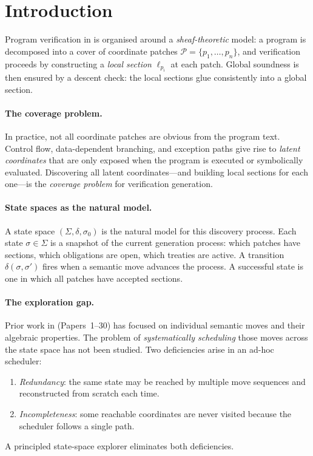 \documentclass[11pt]{article}
\newcommand{\St}{\Sigma}                      %
\newcommand{\state}{\sigma}                   %
\newcommand{\Trans}{\delta}                   %
\newcommand{\LocalSec}{\ell}                  %
\newcommand{\patchset}{\mathcal{P}}           %
\begin{document}
\newpage

\section{Introduction}\label{sec:intro}

Program verification in \JuGeo{} is organised around a
\emph{sheaf-theoretic} model: a program is decomposed into a cover of
coordinate patches $\patchset = \{p_1, \dots, p_n\}$, and verification
proceeds by constructing a \emph{local section} $\LocalSec_{p_i}$ at
each patch.  Global soundness is then ensured by a descent check: the
local sections glue consistently into a global section.

\paragraph{The coverage problem.}
In practice, not all coordinate patches are obvious from the program
text.  Control flow, data-dependent branching, and exception paths
give rise to \emph{latent coordinates} that are only exposed when the
program is executed or symbolically evaluated.  Discovering all latent
coordinates---and building local sections for each one---is the
\emph{coverage problem} for verification generation.

\paragraph{State spaces as the natural model.}
A state space $(\St, \Trans, \state_0)$ is the natural model for this
discovery process.  Each state $\state \in \St$ is a snapshot of the
current generation process: which patches have sections, which
obligations are open, which treaties are active.  A transition
$\Trans(\state, \state')$ fires when a semantic move advances
the process.  A successful state is one in which all patches have
accepted sections.

\paragraph{The exploration gap.}
Prior work in \JuGeo{} (Papers~1--30) has focused on individual
semantic moves and their algebraic properties.  The problem of
\emph{systematically scheduling} those moves across the state space has
not been studied.  Two deficiencies arise in an ad-hoc scheduler:
\begin{enumerate}[label=(\roman*)]
  \item \emph{Redundancy}: the same state may be reached by multiple
    move sequences and reconstructed from scratch each time.
  \item \emph{Incompleteness}: some reachable coordinates are never
    visited because the scheduler follows a single path.
\end{enumerate}
A principled state-space explorer eliminates both deficiencies.
\end{document}
